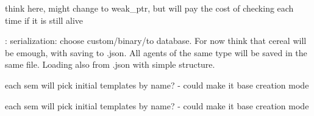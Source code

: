 \begin{DoxyRefList}
\item[\label{_dev_stage2__DevStage2000030}%
\hypertarget{_dev_stage2__DevStage2000030}{}%
Member \hyperlink{classsolar__core_1_1_w_a1d35d6501eef6d673bd2b28e2c1724c4}{solar\+\_\+core\+:\+:W\+:\+:interconnected\+\_\+projects} ]think here, might change to weak\+\_\+ptr, but will pay the cost of checking each time if it is still alive  
\item[\label{_dev_stage2__DevStage2000029}%
\hypertarget{_dev_stage2__DevStage2000029}{}%
Member \hyperlink{classsolar__core_1_1_w_a969ad4de57020878a91873868c9bdb45}{solar\+\_\+core\+:\+:W\+:\+:W} (std\+::string path\+\_\+, \hyperlink{classsolar__core_1_1_helper_w}{Helper\+W} $\ast$w\+\_\+, std\+::string mode\+\_\+=\char`\"{}\+N\+E\+W\char`\"{})]\+: serialization\+: choose custom/binary/to database. For now think that cereal will be emough, with saving to .json. All agents of the same type will be saved in the same file. Loading also from .json with simple structure.

each sem will pick initial templates by name? -\/ could make it base creation mode 

each sem will pick initial templates by name? -\/ could make it base creation mode 
\end{DoxyRefList}